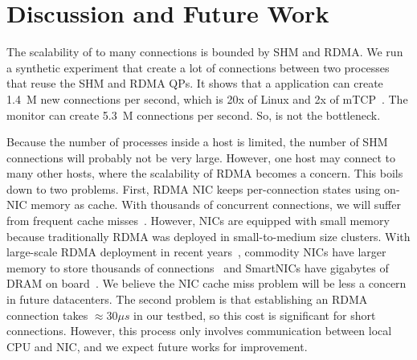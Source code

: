 \section{Discussion and Future Work}
\label{sec:discussion}



The scalability of \sys{} to many connections is bounded by SHM and RDMA.
We run a synthetic experiment that create a lot of connections between two processes that reuse the SHM and RDMA QPs. It shows that a \sys{} application can create 1.4~M new connections per second, which is 20x of Linux and 2x of mTCP~\cite{jeong2014mtcp}. The monitor can create 5.3~M connections per second. So, \sys{} is not the bottleneck.

Because the number of processes inside a host is limited, the number of SHM connections will probably not be very large.
However, one host may connect to many other hosts, where the scalability of RDMA becomes a concern.
This boils down to two problems.
First, RDMA NIC keeps per-connection states using on-NIC memory as cache. With thousands of concurrent connections, we will suffer from frequent cache misses~\cite{mprdma,kaminsky2016design,kalia2018datacenter}.
However, NICs are equipped with small memory because traditionally RDMA was deployed in small-to-medium size clusters.
With large-scale RDMA deployment in recent years~\cite{guo2016rdma}, commodity NICs have larger memory to store thousands of connections~\cite{kalia2018datacenter} and SmartNICs have gigabytes of DRAM on board~\cite{mellanox-innova,mellanox-bluefield,smartnic}.
We believe the NIC cache miss problem will be less a concern in future datacenters.
The second problem is that establishing an RDMA connection takes $\approx30 \mu s$ in our testbed, so this cost is significant for short connections. However, this process only involves communication between local CPU and NIC, and we expect future works for improvement.

